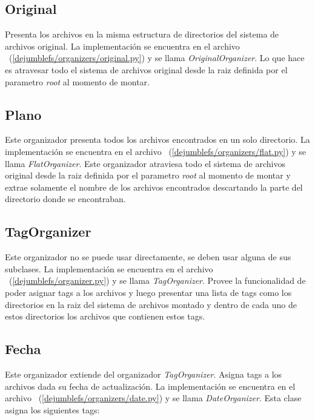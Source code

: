 \subsection{Original}

Presenta los archivos en la misma estructura de directorios del sistema de archivos original. La implementación se encuentra en el archivo ~(\ref{dejumblefs/organizers/original.py}) y se llama \textit{OriginalOrganizer}. Lo que hace es atravesar todo el sistema de archivos original desde la raiz definida por el parametro \textit{root} al momento de montar.

\subsection{Plano}

Este organizador presenta todos los archivos encontrados en un solo directorio. La implementación se encuentra en el archivo ~(\ref{dejumblefs/organizers/flat.py}) y se llama \textit{FlatOrganizer}. Este organizador atraviesa todo el sistema de archivos original desde la raiz definida por el parametro \textit{root} al momento de montar y extrae solamente el nombre de los archivos encontrados descartando la parte del directorio donde se encontraban.

\subsection{TagOrganizer}

Este organizador no se puede usar directamente, se deben usar alguna de sus subclases. La implementación se encuentra en el archivo ~(\ref{dejumblefs/organizer.py}) y se llama \textit{TagOrganizer}. Provee la funcionalidad de poder asignar tags a los archivos y luego presentar una lista de tags como los directorios en la raiz del sistema de archivos montado y dentro de cada uno de estos directorios los archivos que contienen estos tags.

\subsection{Fecha}

Este organizador extiende del organizador \textit{TagOrganizer}. Asigna tags a los archivos dada su fecha de actualización. La implementación se encuentra en el archivo ~(\ref{dejumblefs/organizers/date.py}) y se llama \textit{DateOrganizer}. Esta clase asigna los siguientes tags:

